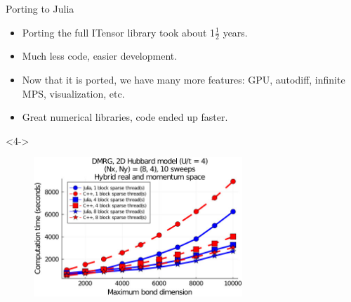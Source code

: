 \begin{frame}{Porting to Julia}

\begin{itemize}[<+->]

  \item Porting the full ITensor library took about 1$\frac{1}{2}$ years.
  \item Much less code, easier development.
  \item Now that it is ported, we have many more features: GPU, autodiff, infinite MPS, visualization, etc.
  \item Great numerical libraries, code ended up faster.

\end{itemize}

\begin{onlyenv}<4->

\begin{figure}[T]
  \includegraphics[width=0.7\textwidth]{
    slides/assets/what-is-julia-itensor-benchmark.jpg
  }
\end{figure}

\end{onlyenv}

\end{frame}
